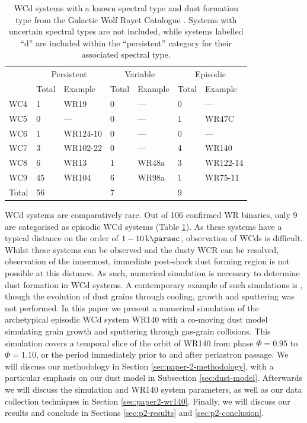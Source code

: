 \begin{table}
  \centering
  \begin{tabular}{lllllll}
    \hline
    & \multicolumn{2}{c}{Persistent} & \multicolumn{2}{c}{Variable} & \multicolumn{2}{c}{Episodic} \\ \cline{2-7} 
    & Total & Example & Total & Example & Total & Example \\ \hline
   WC4 & 1 & WR19 & 0 & --- & 0 & --- \\
   WC5 & 0 & --- & 0 & --- & 1 & WR47C \\
   WC6 & 1 & WR124-10 & 0 & --- & 0 & --- \\
   WC7 & 3 & WR102-22 & 0 & --- & 4 & WR140 \\
   WC8 & 6 & WR13 & 1 & WR48a & 3 & WR122-14 \\
   WC9 & 45 & WR104 & 6 & WR98a & 1 & WR75-11 \\ \hline
   Total & 56 &  & 7 &  & 9 &  \\ \hline
  \end{tabular}
  \caption[Confirmed WCd systems]{WCd systems with a known spectral type and dust formation type from the Galactic Wolf Rayet Catalogue \parencite{rossloweSpatialDistributionGalactic2015}. Systems with uncertain spectral types are not included, while systems labelled ``d'' are included within the ``persistent'' category for their associated spectral type.}
  \label{tab:p2-wc-summated-list}
\end{table}

WCd systems are comparatively rare.
Out of 106 confirmed WR binaries, only 9 are categorised as episodic WCd systems
(Table \ref{tab:p2-wc-summated-list}).
As these systems have a typical distance on the order of $1-10 \, \si{\kilo\parsec}$, observation of WCds is difficult.
Whilst these systems can be observed and the dusty WCR can be resolved, observation of the innermost, immediate post-shock dust forming region is not possible at this distance.
As such, numerical simulation is necessary to determine dust formation in WCd systems.
A contemporary example of such simulations is \textcite{hendrix_pinwheels_2016}, though the evolution of dust grains through cooling, growth and sputtering was not performed.
In this paper we present a numerical simulation of the archetypical episodic WCd system WR140 with a co-moving dust model simulating grain growth and sputtering through gas-grain collisions.
This simulation covers a temporal slice of the orbit of WR140 from phase $\Phi = 0.95$ to $\Phi = 1.10$, or the period immediately prior to and after periastron passage.
We will discuss our methodology in Section \ref{sec:paper-2-methodology}, with a particular emphasis on our dust model in Subsection \ref{sec:dust-model}.
Afterwards we will discuss the simulation and WR140 system parameters, as well as our data collection techniques in Section \ref{sec:paper2-wr140}.
Finally, we will discuss our results and conclude in Sections \ref{sec:p2-results} and \ref{sec:p2-conclusion}.


